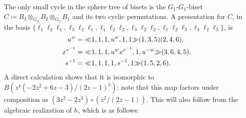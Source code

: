 \documentclass{amsart}
\begin{document}
The only small cycle in the sphere tree of bisets is the
$G_1$-$G_1$-biset $C\coloneqq B_3\otimes_{G_3}B_2\otimes_{G_2}B_1$ and
its two cyclic permutations. A presentation for $C$, in the basis
$\{\ell_1\ell_2\ell_1,\ell_3\ell_2\ell_1,\ell_1\ell_2\ell_2,\ell_3\ell_2\ell_2,\ell_1\ell_2\ell_3,\ell_3\ell_2\ell_3\}$,
is
\begin{align*}
  u^w&={\ll}1,1,1,u^w,1,1{\gg}(1,3,5)(2,4,6),\\
  x^{v^{-1}}&={\ll}1,1,1,u^w x^{v^{-1}},1,u^{-w}{\gg}(3,6,4,5),\\
  s^{-1}&={\ll}1,1,1,1,s^{-1},1{\gg}(1,5,2,6).
\end{align*}
A direct calculation shows that it is isomorphic to
$B(z^4(-2z^2+6z-3)/(2z-1)^3)$; note that this map factors under
composition as $(3z^2-2z^3)\circ(z^2/(2z-1))$. This will also follow
from the algebraic realization of $h$, which is as follows:
\end{document}
